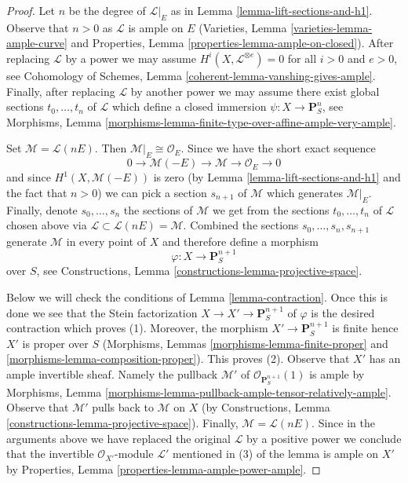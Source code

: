 \begin{proof}
Let $n$ be the degree of $\mathcal{L}|_E$ as in
Lemma \ref{lemma-lift-sections-and-h1}.
Observe that $n > 0$ as $\mathcal{L}$ is ample on $E$
(Varieties, Lemma \ref{varieties-lemma-ample-curve} and
Properties, Lemma \ref{properties-lemma-ample-on-closed}).
After replacing $\mathcal{L}$ by a power we may assume
$H^i(X, \mathcal{L}^{\otimes e}) = 0$ for all $i > 0$ and $e > 0$, see
Cohomology of Schemes,
Lemma \ref{coherent-lemma-vanshing-gives-ample}.
Finally, after replacing $\mathcal{L}$ by another power we may assume
there exist global sections $t_0, \ldots, t_n$ of $\mathcal{L}$
which define a closed immersion $\psi : X \to \mathbf{P}^n_S$, see
Morphisms, Lemma
\ref{morphisms-lemma-finite-type-over-affine-ample-very-ample}.

\medskip\noindent
Set $\mathcal{M} = \mathcal{L}(nE)$. Then $\mathcal{M}|_E \cong \mathcal{O}_E$.
Since we have the short exact sequence
$$
0 \to \mathcal{M}(-E) \to \mathcal{M} \to \mathcal{O}_E \to 0
$$
and since $H^1(X, \mathcal{M}(-E))$ is zero
(by Lemma \ref{lemma-lift-sections-and-h1} and the fact that $n > 0$)
we can pick a section $s_{n + 1}$ of $\mathcal{M}$ which generates
$\mathcal{M}|_E$.
Finally, denote $s_0, \ldots, s_n$ the sections of $\mathcal{M}$
we get from the sections $t_0, \ldots, t_n$ of $\mathcal{L}$
chosen above via $\mathcal{L} \subset \mathcal{L}(nE) = \mathcal{M}$.
Combined the sections $s_0, \ldots, s_n, s_{n + 1}$
generate $\mathcal{M}$ in every point of $X$ and therefore define
a morphism
$$
\varphi : X \longrightarrow \mathbf{P}^{n + 1}_S
$$
over $S$, see Constructions, Lemma \ref{constructions-lemma-projective-space}.

\medskip\noindent
Below we will check the conditions of Lemma \ref{lemma-contraction}.
Once this is done we see that the Stein factorization
$X \to X' \to \mathbf{P}^{n + 1}_S$ of $\varphi$ is the desired contraction
which proves (1).
Moreover, the morphism $X' \to \mathbf{P}^{n + 1}_S$ is finite
hence $X'$ is proper over $S$
(Morphisms, Lemmas \ref{morphisms-lemma-finite-proper} and
\ref{morphisms-lemma-composition-proper}). This proves (2).
Observe that $X'$ has an ample invertible sheaf. Namely the pullback
$\mathcal{M}'$ of $\mathcal{O}_{\mathbf{P}^{n + 1}_S}(1)$ is ample by
Morphisms, Lemma \ref{morphisms-lemma-pullback-ample-tensor-relatively-ample}.
Observe that $\mathcal{M}'$ pulls back to $\mathcal{M}$ on $X$
(by Constructions, Lemma \ref{constructions-lemma-projective-space}).
Finally, $\mathcal{M} = \mathcal{L}(nE)$. Since in the arguments above
we have replaced the original $\mathcal{L}$ by a positive power
we conclude that the invertible $\mathcal{O}_{X'}$-module $\mathcal{L}'$
mentioned in (3) of the lemma is ample on $X'$ by
Properties, Lemma \ref{properties-lemma-ample-power-ample}.


\end{proof}

